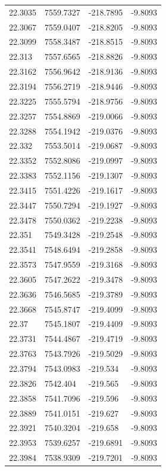 \begin{table}[H]
\begin{tabular}{llll}
22.3035 & 7559.7327 & -218.7895 & -9.8093 \\
22.3067 & 7559.0407 & -218.8205 & -9.8093 \\
22.3099 & 7558.3487 & -218.8515 & -9.8093 \\
22.313 & 7557.6565 & -218.8826 & -9.8093 \\
22.3162 & 7556.9642 & -218.9136 & -9.8093 \\
22.3194 & 7556.2719 & -218.9446 & -9.8093 \\
22.3225 & 7555.5794 & -218.9756 & -9.8093 \\
22.3257 & 7554.8869 & -219.0066 & -9.8093 \\
22.3288 & 7554.1942 & -219.0376 & -9.8093 \\
22.332 & 7553.5014 & -219.0687 & -9.8093 \\
22.3352 & 7552.8086 & -219.0997 & -9.8093 \\
22.3383 & 7552.1156 & -219.1307 & -9.8093 \\
22.3415 & 7551.4226 & -219.1617 & -9.8093 \\
22.3447 & 7550.7294 & -219.1927 & -9.8093 \\
22.3478 & 7550.0362 & -219.2238 & -9.8093 \\
22.351 & 7549.3428 & -219.2548 & -9.8093 \\
22.3541 & 7548.6494 & -219.2858 & -9.8093 \\
22.3573 & 7547.9559 & -219.3168 & -9.8093 \\
22.3605 & 7547.2622 & -219.3478 & -9.8093 \\
22.3636 & 7546.5685 & -219.3789 & -9.8093 \\
22.3668 & 7545.8747 & -219.4099 & -9.8093 \\
22.37 & 7545.1807 & -219.4409 & -9.8093 \\
22.3731 & 7544.4867 & -219.4719 & -9.8093 \\
22.3763 & 7543.7926 & -219.5029 & -9.8093 \\
22.3794 & 7543.0983 & -219.534 & -9.8093 \\
22.3826 & 7542.404 & -219.565 & -9.8093 \\
22.3858 & 7541.7096 & -219.596 & -9.8093 \\
22.3889 & 7541.0151 & -219.627 & -9.8093 \\
22.3921 & 7540.3204 & -219.658 & -9.8093 \\
22.3953 & 7539.6257 & -219.6891 & -9.8093 \\
22.3984 & 7538.9309 & -219.7201 & -9.8093 \\

\end{tabular}
\end{table}
